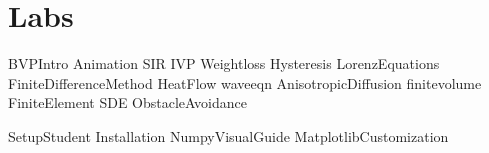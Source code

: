\documentclass[opener-c,labs,green,nociteref]{HJnewsiambook}
\begin{document}
\part{Labs}
{BVPIntro}
{Animation}
{SIR}
{IVP} 
{Weightloss}
{Hysteresis}
{LorenzEquations}
{FiniteDifferenceMethod}
{HeatFlow}
{waveeqn}
{AnisotropicDiffusion}
{finitevolume}
{FiniteElement}
{SDE}
{ObstacleAvoidance}


%
\begin{appendices}
{SetupStudent}
{Installation}
{NumpyVisualGuide}
 {MatplotlibCustomization}
\end{appendices}



\end{document}
